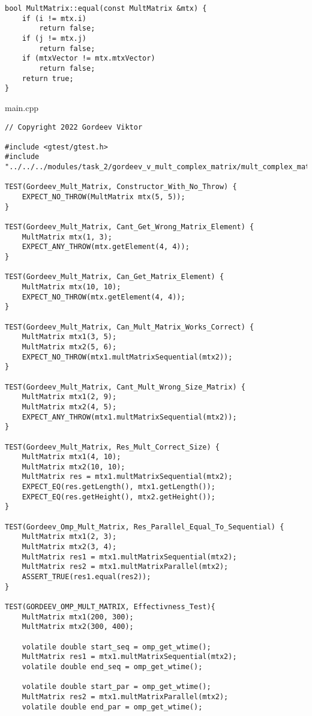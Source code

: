 \documentclass{report}
\begin{document}
\begin{enumerate}
\begin{lstlisting}
bool MultMatrix::equal(const MultMatrix &mtx) {
    if (i != mtx.i)
        return false;
    if (j != mtx.j)
        return false;
    if (mtxVector != mtx.mtxVector)
        return false;
    return true;
}

\end{lstlisting}
main.cpp
\begin{lstlisting}
// Copyright 2022 Gordeev Viktor

#include <gtest/gtest.h>
#include "../../../modules/task_2/gordeev_v_mult_complex_matrix/mult_complex_matrix.h"

TEST(Gordeev_Mult_Matrix, Constructor_With_No_Throw) {
    EXPECT_NO_THROW(MultMatrix mtx(5, 5));
}

TEST(Gordeev_Mult_Matrix, Cant_Get_Wrong_Matrix_Element) {
    MultMatrix mtx(1, 3);
    EXPECT_ANY_THROW(mtx.getElement(4, 4));
}

TEST(Gordeev_Mult_Matrix, Can_Get_Matrix_Element) {
    MultMatrix mtx(10, 10);
    EXPECT_NO_THROW(mtx.getElement(4, 4));
}

TEST(Gordeev_Mult_Matrix, Can_Mult_Matrix_Works_Correct) {
    MultMatrix mtx1(3, 5);
    MultMatrix mtx2(5, 6);
    EXPECT_NO_THROW(mtx1.multMatrixSequential(mtx2));
}

TEST(Gordeev_Mult_Matrix, Cant_Mult_Wrong_Size_Matrix) {
    MultMatrix mtx1(2, 9);
    MultMatrix mtx2(4, 5);
    EXPECT_ANY_THROW(mtx1.multMatrixSequential(mtx2));
}

TEST(Gordeev_Mult_Matrix, Res_Mult_Correct_Size) {
    MultMatrix mtx1(4, 10);
    MultMatrix mtx2(10, 10);
    MultMatrix res = mtx1.multMatrixSequential(mtx2);
    EXPECT_EQ(res.getLength(), mtx1.getLength());
    EXPECT_EQ(res.getHeight(), mtx2.getHeight());
}

TEST(Gordeev_Omp_Mult_Matrix, Res_Parallel_Equal_To_Sequential) {
    MultMatrix mtx1(2, 3);
    MultMatrix mtx2(3, 4);
    MultMatrix res1 = mtx1.multMatrixSequential(mtx2);
    MultMatrix res2 = mtx1.multMatrixParallel(mtx2);
    ASSERT_TRUE(res1.equal(res2));
}

TEST(GORDEEV_OMP_MULT_MATRIX, Effectivness_Test){
    MultMatrix mtx1(200, 300);
    MultMatrix mtx2(300, 400);

    volatile double start_seq = omp_get_wtime();
    MultMatrix res1 = mtx1.multMatrixSequential(mtx2);
    volatile double end_seq = omp_get_wtime();

    volatile double start_par = omp_get_wtime();
    MultMatrix res2 = mtx1.multMatrixParallel(mtx2);
    volatile double end_par = omp_get_wtime();


\end{lstlisting}
\end{enumerate}
\end{document}

